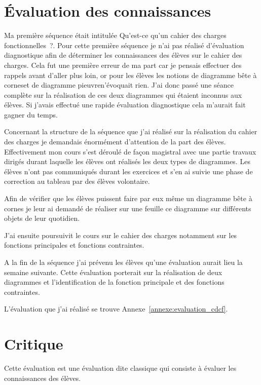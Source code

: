 
\section{Évaluation des connaissances}

Ma première séquence était intitulée \og Qu'est-ce qu'un cahier des charges fonctionnelles~?\fg. 
Pour cette première séquence je n'ai pas réalisé d'évaluation diagnostique afin de déterminer les connaissances des élèves sur le cahier des charges.
Cela fut une première erreur de ma part car je pensais effectuer des rappels avant d'aller plus loin, or pour les élèves les notions de \og diagramme bête à cornes\fg et de \og diagramme pieuvre\fg n'évoquait rien. J'ai donc passé une séance complète sur la réalisation de ces deux diagrammes qui étaient inconnus aux élèves.
Si j'avais effectué une rapide évaluation diagnostique cela m'aurait fait gagner du temps.

Concernant la structure de la séquence que j'ai réalisé sur la réalisation du cahier des charges je demandais énormément d'attention de la part des élèves.
Effectivement mon cours s'est déroulé de façon magistral avec une partie travaux dirigés durant laquelle les élèves ont réalisés les deux types de diagrammes.
Les élèves n'ont pas communiqués durant les exercices et s'en ai suivie une phase de correction au tableau par des élèves volontaire.

Afin de vérifier que les élèves puissent faire par eux même un diagramme bête à cornes je leur ai demandé de réaliser sur une feuille ce diagramme sur différents objets de leur quotidien.

J'ai ensuite poursuivit le cours sur le cahier des charges notamment sur les fonctions principales et fonctions contraintes.

A la fin de la séquence j'ai prévenu les élèves qu'une évaluation aurait lieu la semaine suivante. Cette évaluation porterait sur la réalisation de deux diagrammes et l'identification de la fonction principale et des fonctions contraintes.

L'évaluation que j'ai réalisé se trouve Annexe~\ref{annexe:evaluation_cdcf}.

\section{Critique}

Cette évaluation est une évaluation dite \og classique \fg qui consiste à évaluer les connaissances des élèves.

